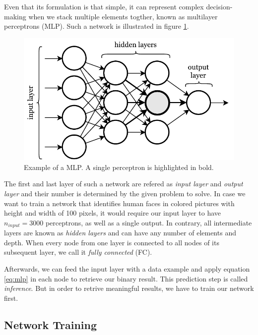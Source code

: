 Even that its formulation is that simple, it can represent complex decision-making when we stack multiple elements togther, known as multilayer perceptrons (MLP). Such a network is illustrated in figure \ref{fig:mlp}.

\begin{figure}[htpb]
	\centering
	\includegraphics[scale=0.8]{figures/mlp.pdf}
	\caption[Multilayer perceptron]{Example of a MLP. A single perceptron is highlighted in bold.} \label{fig:mlp}
\end{figure}

The first and last layer of such a network are refered as \textit{input layer} and \textit{output layer} and their number is determined by the given problem to solve. In case we want to train a network that identifies human faces in colored pictures with height and width of 100 pixels, it would require our input layer to have $ n_{input}=3000 $ perceptrons, as well as a single output. In contrary, all intermediate layers are known as \textit{hidden layers} and can have any number of elements and depth. When every node from one layer is connected to all nodes of its subsequent layer, we call it \textit{fully connected} (FC).

Afterwards, we can feed the input layer with a data example and apply equation \ref{eq:mlp} in each node to retrieve our binary result. This prediction step is called \textit{inference}. But in order to retrive meaningful results, we have to train our network first.

\subsection{Network Training}

